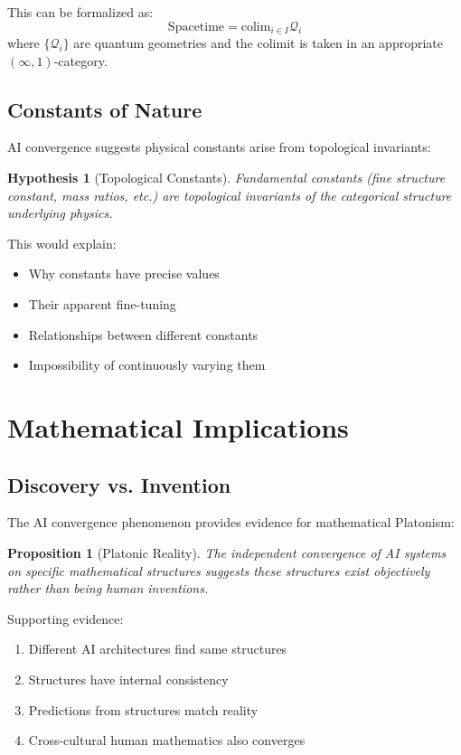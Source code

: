 \documentclass[11pt,a4paper]{article}
\newtheorem{proposition}[theorem]{Proposition}
\newtheorem{hypothesis}[theorem]{Hypothesis}
\begin{document}
This can be formalized as:
\[
\text{Spacetime} = \text{colim}_{i \in I} \mathcal{Q}_i
\]
where $\{\mathcal{Q}_i\}$ are quantum geometries and the colimit is taken in an appropriate $(\infty,1)$-category.

\subsection{Constants of Nature}

AI convergence suggests physical constants arise from topological invariants:

\begin{hypothesis}[Topological Constants]
Fundamental constants (fine structure constant, mass ratios, etc.) are topological invariants of the categorical structure underlying physics.
\end{hypothesis}

This would explain:
\begin{itemize}
    \item Why constants have precise values
    \item Their apparent fine-tuning
    \item Relationships between different constants
    \item Impossibility of continuously varying them
\end{itemize}

\section{Mathematical Implications}

\subsection{Discovery vs. Invention}

The AI convergence phenomenon provides evidence for mathematical Platonism:

\begin{proposition}[Platonic Reality]
The independent convergence of AI systems on specific mathematical structures suggests these structures exist objectively rather than being human inventions.
\end{proposition}

Supporting evidence:
\begin{enumerate}
    \item Different AI architectures find same structures
    \item Structures have internal consistency
    \item Predictions from structures match reality
    \item Cross-cultural human mathematics also converges
\end{enumerate}
\end{document}

